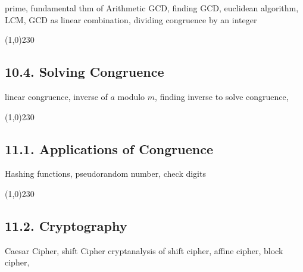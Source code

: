 prime, fundamental thm of Arithmetic
GCD, finding GCD, euclidean algorithm,
LCM, GCD as linear combination, dividing congruence by an integer

\begin{center}
\line(1,0){230}
\end{center}

\subsection*{10.4. Solving Congruence}

linear congruence, inverse of $a$ modulo $m$,
finding inverse to solve congruence,

\begin{center}
\line(1,0){230}
\end{center}

\subsection*{11.1. Applications of Congruence}

Hashing functions, pseudorandom number, check digits

\begin{center}
\line(1,0){230}
\end{center}

\subsection*{11.2. Cryptography}

Caesar Cipher, shift Cipher
cryptanalysis of shift cipher,
affine cipher, block cipher,